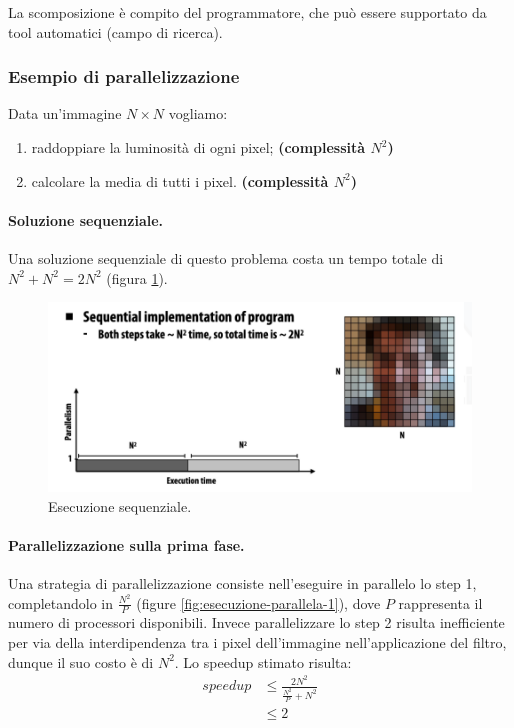 La scomposizione è compito del programmatore, che può essere supportato da tool automatici (campo di ricerca).

\subsubsection*{Esempio di parallelizzazione}
Data un'immagine $N\times N$ vogliamo:
\begin{enumerate}[label=$\bullet$ \textbf{Step \arabic*:}]
    \item raddoppiare la luminosità di ogni pixel; {\color{NavyBlue}\textbf{(complessità $N^2$)}}
    \item calcolare la media di tutti i pixel. {\color{NavyBlue}\textbf{(complessità $N^2$)}}
\end{enumerate}

\paragraph{Soluzione sequenziale.} Una soluzione sequenziale di questo problema costa un tempo totale di {\color{NavyBlue}$N^2+N^2=2N^2$} (figura \ref{fig:esecuzione-sequenziale}). 
\begin{figure}[th]
	\centering
	\includegraphics[width=0.7\linewidth]{img/esecuzione-sequenziale.png}
	\caption{Esecuzione sequenziale.}
	\label{fig:esecuzione-sequenziale}
\end{figure}

\paragraph{Parallelizzazione sulla prima fase.}Una strategia di parallelizzazione consiste nell'eseguire in parallelo lo step 1, completandolo in $\frac{N^2}{P}$ (figure \ref{fig:esecuzione-parallela-1}), dove $P$ rappresenta il numero di processori disponibili. Invece parallelizzare lo step 2 risulta inefficiente  per via della interdipendenza tra i pixel dell'immagine nell'applicazione del filtro, dunque il suo costo è di $N^2$. Lo speedup stimato risulta:
\begin{align*}
    speedup &\le \frac{2N^2}{\frac{N^2}{P} + N^2}\\
    &\le 2
\end{align*}

